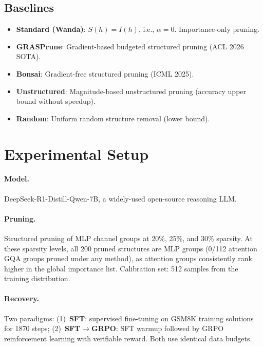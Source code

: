 \documentclass[11pt,a4paper]{article}
\begin{document}
\subsection{Baselines}

\begin{itemize}
    \item \textbf{Standard (Wanda)}: $S(h) = I(h)$, i.e., $\alpha=0$. Importance-only pruning.
    \item \textbf{GRASPrune}: Gradient-based budgeted structured pruning (ACL 2026 SOTA).
    \item \textbf{Bonsai}: Gradient-free structured pruning (ICML 2025).
    \item \textbf{Unstructured}: Magnitude-based unstructured pruning (accuracy upper bound without speedup).
    \item \textbf{Random}: Uniform random structure removal (lower bound).
\end{itemize}


\section{Experimental Setup}
\label{sec:setup}

\paragraph{Model.} DeepSeek-R1-Distill-Qwen-7B, a widely-used open-source reasoning LLM.

\paragraph{Pruning.} Structured pruning of MLP channel groups at 20\%, 25\%, and 30\% sparsity. At these sparsity levels, all 200 pruned structures are MLP groups (0/112 attention GQA groups pruned under any method), as attention groups consistently rank higher in the global importance list. Calibration set: 512 samples from the training distribution.

\paragraph{Recovery.} Two paradigms: (1)~\textbf{SFT}: supervised fine-tuning on GSM8K training solutions for 1870 steps; (2)~\textbf{SFT$\to$GRPO}: SFT warmup followed by GRPO reinforcement learning with verifiable reward. Both use identical data budgets.
\end{document}
